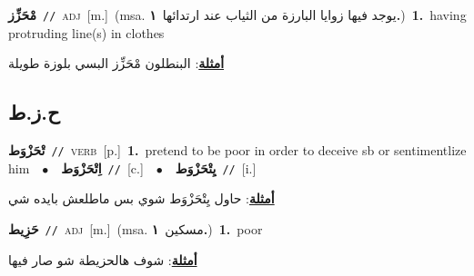 \documentclass[10pt,a4paper,twoside]{article} %
\begin{document}
\begin{multicols}{2}
{\setlength\topsep{0pt}\textbf{\foreignlanguage{arabic}{مْحَزِّز}}\ {\color{gray}\texttt{//}\color{black}}\ \textsc{adj}\ [m.]\ \color{gray}(msa. \foreignlanguage{arabic}{يوجد فيها زوايا البارزة من الثياب عند ارتدائها}~\foreignlanguage{arabic}{\textbf{١.}})\color{black}\ \textbf{1.}~having protruding line(s) in clothes\  \begin{flushright}\color{gray}\foreignlanguage{arabic}{\textbf{\underline{\foreignlanguage{arabic}{أمثلة}}}: البنطلون مْحَزِّز البسي بلوزة طويلة}\end{flushright}\color{black}} \vspace{2mm}

\vspace{-3mm}
\subsection*{\color{blue}\foreignlanguage{arabic}{ح.ز.ط}\color{blue}{}} 

{\setlength\topsep{0pt}\textbf{\foreignlanguage{arabic}{تْحَزْوَط}}\ {\color{gray}\texttt{//}\color{black}}\ \textsc{verb}\ [p.]\ \textbf{1.}~pretend to be poor in order to deceive sb or sentimentlize him\ \ $\bullet$\ \ \setlength\topsep{0pt}\textbf{\foreignlanguage{arabic}{اِتْحَزْوَط}}\ {\color{gray}\texttt{//}\color{black}}\ [c.]\ \ $\bullet$\ \ \setlength\topsep{0pt}\textbf{\foreignlanguage{arabic}{يِتْحَزْوَط}}\ {\color{gray}\texttt{//}\color{black}}\ [i.]\  \begin{flushright}\color{gray}\foreignlanguage{arabic}{\textbf{\underline{\foreignlanguage{arabic}{أمثلة}}}: حاول يِتْحَزْوَط شوي بس ماطلعش بايده شي}\end{flushright}\color{black}} \vspace{2mm}

{\setlength\topsep{0pt}\textbf{\foreignlanguage{arabic}{حَزِيط}}\ {\color{gray}\texttt{//}\color{black}}\ \textsc{adj}\ [m.]\ \color{gray}(msa. \foreignlanguage{arabic}{مسكين}~\foreignlanguage{arabic}{\textbf{١.}})\color{black}\ \textbf{1.}~poor\  \begin{flushright}\color{gray}\foreignlanguage{arabic}{\textbf{\underline{\foreignlanguage{arabic}{أمثلة}}}: شوف هالحزيطة شو صار فيها}\end{flushright}\color{black}} \vspace{2mm}


\end{multicols}
\end{document}
